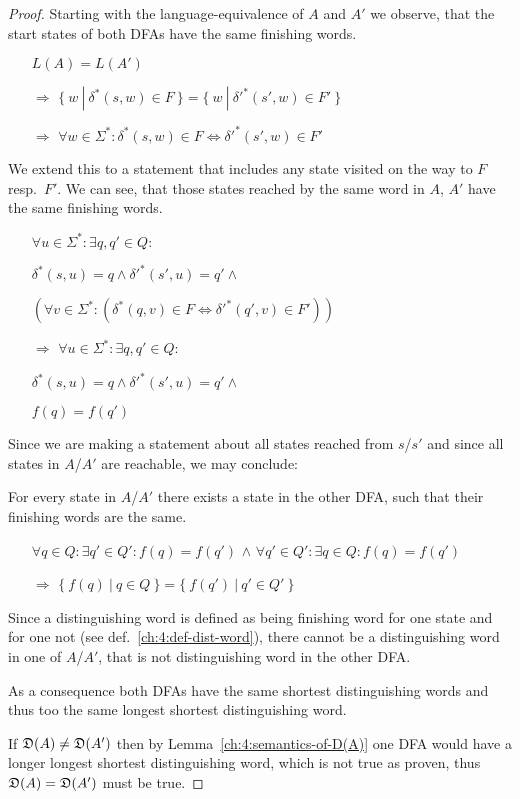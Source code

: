 \begin{proof}
	Starting with the language-equivalence of $A$ and $A'$ we observe, that the start states of both DFAs have the same finishing words.
	\begin{itemize}
		\item[] $L(A) = L(A')$
		
		\item[$\Rightarrow$] $\{\ w\ |\ \delta^*(s, w) \in F\ \} = \{\ w\ |\ \delta'^*(s', w) \in F'\ \}$
		
		\item[$\Rightarrow$] $\forall w \in \Sigma^*\colon \delta^*(s, w) \in F \Leftrightarrow \delta'^*(s', w) \in F'$
	\end{itemize}
	We extend this to a statement that includes any state visited on the way to $F$ resp.\ $F'$. We can see, that those states reached by the same word in $A$, $A'$ have the same finishing words.
	\begin{itemize}
		\item[] $\forall u \in \Sigma^*\colon \exists q,q' \in Q\colon$
		
		\qquad $\delta^*(s, u) = q \land \delta'^*(s', u) = q' \land$
		
		\qquad $(\forall v \in \Sigma^*\colon (\delta^*(q, v) \in F \Leftrightarrow \delta'^*(q', v) \in F'))$
		
		\item[$\Rightarrow$] $\forall u \in \Sigma^*\colon \exists q,q' \in Q\colon$
		
		\qquad $\delta^*(s, u) = q \land \delta'^*(s', u) = q' \land$
		
		\qquad $f(q) = f(q')$
	\end{itemize}
	Since we are making a statement about all states reached from $s$/$s'$ and since all states in $A$/$A'$ are reachable, we may conclude:
	
	For every state in $A$/$A'$ there exists a state in the other DFA, such that their finishing words are the same.
	\begin{itemize}
		\item [] $\forall q \in Q\colon \exists q' \in Q'\colon f(q) = f(q')$ \hfill $\land$ \hfill $\forall q' \in Q'\colon \exists q \in Q\colon f(q) = f(q')$ \qquad \qquad \qquad \qquad
		
		\item[$\Rightarrow$] $\{\ f(q)\ |\ q \in Q\ \} = \{\ f(q')\ |\ q' \in Q'\ \}$
	\end{itemize}
	Since a distinguishing word is defined as being finishing word for one state and for one not (see def.~\ref{ch:4:def-dist-word}), there cannot be a distinguishing word in one of $A$/$A'$, that is not distinguishing word in the other DFA.
	
	As a consequence both DFAs have the same shortest distinguishing words and thus too the same longest shortest distinguishing word.
	
	If $\mathfrak{D}(A) \neq \mathfrak{D}(A')$ then by Lemma~\ref{ch:4:semantics-of-D(A)} one DFA would have a longer longest shortest distinguishing word, which is not true as proven, thus $\mathfrak{D}(A) = \mathfrak{D}(A')$ must be true. 
\end{proof}


